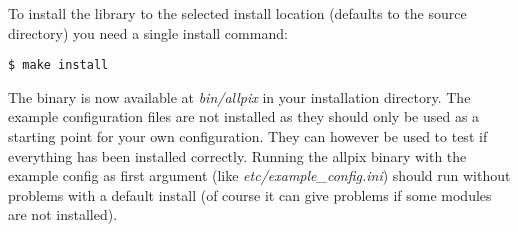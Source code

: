 To install the library to the selected install location (defaults to the source directory) you need a single install command:
\begin{verbatim}
$ make install
\end{verbatim}

The binary is now available at \textit{bin/allpix} in your installation directory. The example configuration files are not installed as they should only be used as a starting point for your own configuration. They can however be used to test if everything has been installed correctly. Running the allpix binary with the example config as first argument (like \textit{etc/example\_config.ini}) should run without problems with a default install (of course it can give problems if some modules are not installed).
